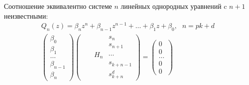 Соотношение эквивалентно системе $n$ линейных однородных уравнений
c $n+1$ неизвестными:
\begin{eqnarray}
\label{QH0}
Q_n(z)=\beta_nz^n+\beta_{n-1}z^{n-1}+\ldots+\beta_1z+\beta_0,
\mbox{     } n=pk+d \nonumber
\\ \left(
\begin{array}{cccccccc}
\beta_0 \\ \beta_1 \\ \ldots \\  \beta_{n-1}
\\ \beta_n
\end{array}
\right) \left(
\begin{array}{ccccccccccc}
 &    &         & s_n     \\
 &    &         & s_{n+1} \\
 &    & H_n     & \cdots \\
 &    &         & s_{k+n-1} \\
 &    &         & s_{k+n}^{d}
\end{array}
\right)= \left(
\begin{array}{cccccccc}
0 \\ 0 \\ \ldots \\ 0 \\ 0
\end{array}
\right)
\end{eqnarray}

